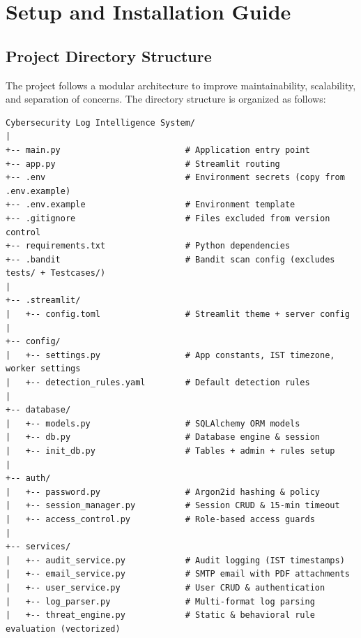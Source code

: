 \documentclass[12pt,a4paper]{article}
\begin{document}
\newpage
\section{Setup and Installation Guide}

\subsection{Project Directory Structure}

\noindent The project follows a modular architecture to improve maintainability, scalability, and separation of concerns. The directory structure is organized as follows:

\vspace{0.3cm}

\begin{tcolorbox}[colback=blue!3!white, colframe=darkblue, arc=5pt, boxrule=0.8pt, left=5pt, right=5pt, top=5pt, bottom=5pt, fontupper=\ttfamily\scriptsize]
\begin{verbatim}
Cybersecurity Log Intelligence System/
|
+-- main.py                         # Application entry point
+-- app.py                          # Streamlit routing
+-- .env                            # Environment secrets (copy from .env.example)
+-- .env.example                    # Environment template
+-- .gitignore                      # Files excluded from version control
+-- requirements.txt                # Python dependencies
+-- .bandit                         # Bandit scan config (excludes tests/ + Testcases/)
|
+-- .streamlit/
|   +-- config.toml                 # Streamlit theme + server config
|
+-- config/
|   +-- settings.py                 # App constants, IST timezone, worker settings
|   +-- detection_rules.yaml        # Default detection rules
|
+-- database/
|   +-- models.py                   # SQLAlchemy ORM models
|   +-- db.py                       # Database engine & session
|   +-- init_db.py                  # Tables + admin + rules setup
|
+-- auth/
|   +-- password.py                 # Argon2id hashing & policy
|   +-- session_manager.py          # Session CRUD & 15-min timeout
|   +-- access_control.py           # Role-based access guards
|
+-- services/
|   +-- audit_service.py            # Audit logging (IST timestamps)
|   +-- email_service.py            # SMTP email with PDF attachments
|   +-- user_service.py             # User CRUD & authentication
|   +-- log_parser.py               # Multi-format log parsing
|   +-- threat_engine.py            # Static & behavioral rule evaluation (vectorized)

\end{verbatim}
\end{tcolorbox}
\end{document}
